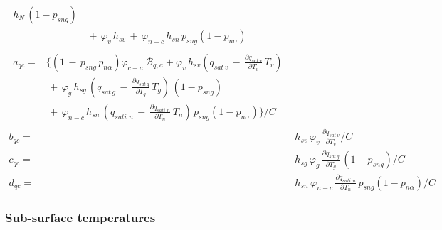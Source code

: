 {\begin{subequations}
\begin{align}
\begin{split}
h_N \,\left(1-p_{sng}\right) 
\\
& \,+\,\varphi_{v} \, h_{sv} 
\,+\,\varphi_{n-c} \, h_{sn} \,p_{sng} \left(1-p_{n\alpha}\right)
\end{split}
\\
\label{eq:meb_qc_eq_s_coefs_n_a_qc_a}
\begin{split}
a_{qc} =& \Big\lbrace
\left(1 \,-\,p_{sng}\,p_{n\alpha} \right) \varphi_{c-a}\,{\mathscr B}_{q,a} + \varphi_{v} \, h_{sv} 
\left( q_{sat\,v} \,-\,{\frac{\partial q_{sat\,v}}{\partial
T_v}}\,T_v\right) 
\\
&  \,+\, \varphi_{g} \, h_{sg} \,
\left( q_{sat\,g} \,-\,{\frac{\partial q_{sat\,g}}{\partial T_g}}\,T_g\right)\,\left(1-p_{sng}\right)
\\ 
& \,+\,
\varphi_{n-c} \, h_{sn} \,
\left( q_{sati\,\,n} \,-\,{\frac{\partial q_{sati\,\,n}}{\partial T_n}}\,T_n\right)
\,p_{sng} \left(1-p_{n\alpha}\right)
\Big\rbrace/C
\end{split}
\\
b_{qc} =& h_{sv}\,\varphi_{v}\,{\frac{\partial q_{sat\,v}}{\partial T_v}}/C
\\
c_{qc} =& h_{sg} \,\varphi_{g}\,{\frac{\partial q_{sat\,g}}{\partial T_g}}\,\left(1-p_{sng}\right)/C
\\
\label{eq:meb_qc_eq_s_coefs_n_d_qc_a}
d_{qc} =& h_{sn} \,\varphi_{n-c}\,{\frac{\partial q_{sati\,\,n}}{\partial T_n}}\,p_{sng}\left(1-p_{n\alpha}\right)/C
%
\end{align}
\end{subequations}




\subsubsection{Sub-surface temperatures}

}
